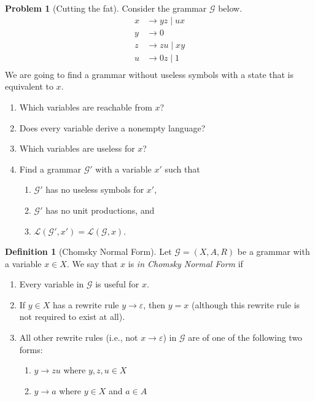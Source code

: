 \documentclass[11pt]{article}
\theoremstyle{definition} %
\newtheorem{definition}     [theorem]   {{\color{NavyBlue}Definition}}
\newtheorem{problem}                    {{\color{BurntOrange}Problem}}
\theoremstyle{remark} %
\begin{document}
\begin{problem}[Cutting the fat]
    Consider the grammar \(\mathcal G\) below.
    \[\begin{aligned}
        x &\to yz \mid ux \\
        y &\to 0  \\
        z &\to zu \mid xy  \\
        u &\to 0z \mid 1  \\
    \end{aligned}\]
    We are going to find a grammar without useless symbols with a state that is equivalent to \(x\).
    \begin{enumerate}
        \item Which variables are reachable from \(x\)?
        \item Does every variable derive a nonempty language?
        \item Which variables are useless for \(x\)?
        \item Find a grammar \(\mathcal G'\) with a variable \(x'\) such that 
        \begin{enumerate}
            \item \(\mathcal G'\) has no useless symbols for \(x'\),
            \item \(\mathcal G'\) has no unit productions, and 
            \item \(\mathcal L(\mathcal G', x') = \mathcal L(\mathcal G, x)\).
        \end{enumerate}
    \end{enumerate}
\end{problem}

\pagebreak 

\begin{definition}[Chomsky Normal Form]
    Let \(\mathcal G = (X, A, R)\) be a grammar with a variable \(x \in X\). 
    We say that \(x\) is \emph{in Chomsky Normal Form} if 
    \begin{enumerate}
        \item Every variable in \(\mathcal G\) is useful for \(x\).
        \item If \(y \in X\) has a rewrite rule \(y \to \varepsilon\), then \(y = x\) (although this rewrite rule is not required to exist at all).
        \item All other rewrite rules (i.e., not \(x \to \varepsilon\)) in \(\mathcal G\) are of one of the following two forms:
        \begin{enumerate}
            \item \(y \to zu\) where \(y,z,u \in X\)
            \item \(y \to a\) where \(y \in X\) and \(a \in A\)
        \end{enumerate}
    \end{enumerate}
\end{definition}
\end{document}
